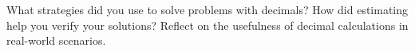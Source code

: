 \documentclass[12pt]{article}
\begin{document}
\vspace{1em}

\begin{tcolorbox}[colframe=black!60, colback=white, 
coltitle=black, colbacktitle=black!15, fonttitle=\bfseries\Large, 
title=Reflection, halign title=center, left=10pt, right=10pt, top=10pt, bottom=100pt]
What strategies did you use to solve problems with decimals? How did estimating help you verify your solutions? Reflect on the usefulness of decimal calculations in real-world scenarios.
\end{tcolorbox}
\end{document}
